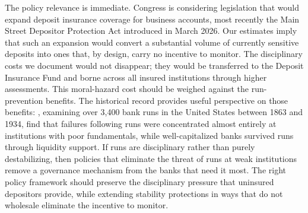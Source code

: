 The policy relevance is immediate.  Congress is considering legislation that would
expand deposit insurance coverage for business accounts, most recently the Main
Street Depositor Protection Act introduced in March 2026.  Our estimates imply
that such an expansion would convert a substantial volume of currently sensitive
deposits into ones that, by design, carry no incentive to monitor.  The
disciplinary costs we document would not disappear; they would be transferred to
the Deposit Insurance Fund and borne across all insured institutions through
higher assessments.  This moral-hazard cost should be weighed against the
run-prevention benefits.  The historical record provides useful perspective on
those benefits: \citet{correia2026bank}, examining over 3{,}400 bank runs in
the United States between 1863 and 1934, find that failures following runs were
concentrated almost entirely at institutions with poor fundamentals, while
well-capitalized banks survived runs through liquidity support.  If runs are
disciplinary rather than purely destabilizing, then policies that eliminate the
threat of runs at weak institutions remove a governance mechanism from the banks
that need it most.  The right policy framework should preserve the disciplinary
pressure that uninsured depositors provide, while extending stability protections
in ways that do not wholesale eliminate the incentive to monitor.
